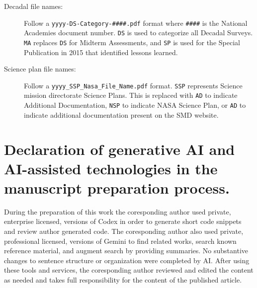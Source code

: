 \documentclass[preprint,12pt,doubleblind]{elsarticle}
\begin{document}
\begin{description}
 \item[Decadal file names:] Follow a \texttt{yyyy-DS-Category-\#\#\#\#.pdf} format where \texttt{\#\#\#\#} is the National Academies document number. \texttt{DS} is used to categorize all Decadal Surveys. \texttt{MA} replaces \texttt{DS} for Midterm Assessments, and \texttt{SP} is used for the Special Publication in 2015 that identified lessons learned.
 
 \item[Science plan file names:] Follow a 
 \texttt{yyyy\_SSP\_Nasa\_File\_Name.pdf} format. 
 \texttt{SSP} represents Science mission directorate Science Plans. 
 This is replaced with \texttt{AD} to indicate Additional Documentation, \texttt{NSP} to indicate NASA Science Plan, or \texttt{AD} to indicate additional documentation present on the SMD website.
\end{description} 

\section*{Declaration of generative AI and AI-assisted technologies in the manuscript preparation process.}
\label{ai_declaration}
During the preparation of this work the coresponding author used private, enterprise licensed, versions of Codex in order to generate short code snippets and review author generated code.
The coresponding author also used private, professional licensed, versions of Gemini to find related works, search known reference material, and augment search by providing summaries. No substantive changes to sentence structure or organization were completed by AI. 
After using these tools and services, the coresponding author reviewed and edited the content as needed and takes full responsibility for the content of the published article.

 

\end{document}
